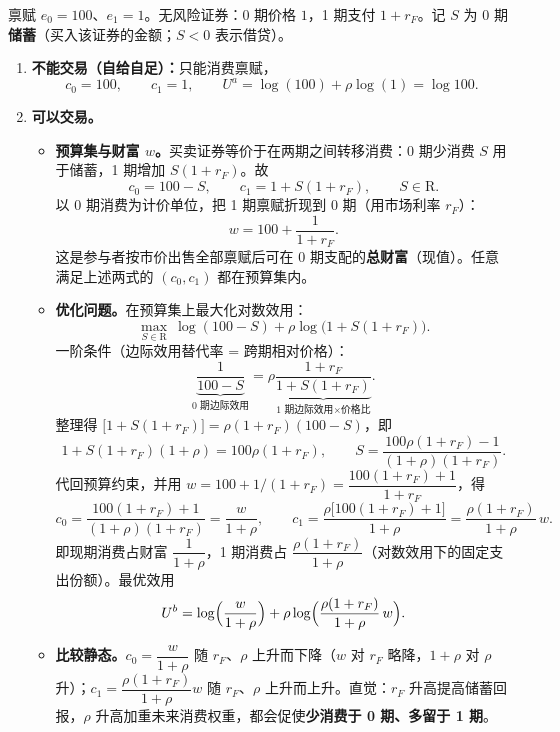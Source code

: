 \begin{solution}
禀赋 $e_0=100$、$e_1=1$。无风险证券：0 期价格 $1$，1 期支付 $1+r_F$。记 $S$ 为 0 期\textbf{储蓄}（买入该证券的金额；$S<0$ 表示借贷）。

\begin{enumerate}[label=(\alph*)]
    \item \textbf{不能交易（自给自足）：}只能消费禀赋，
    \[
        c_0=100,\qquad c_1=1,\qquad
        U^{a}=\log(100)+\rho\log(1)=\log 100.
    \]

    \item \textbf{可以交易。}
    \begin{itemize}
        \item \textbf{预算集与财富 $w$。}买卖证券等价于在两期之间转移消费：0 期少消费 $S$ 用于储蓄，1 期增加 $S(1+r_F)$。故
        \[
            c_0=100-S,\qquad c_1=1+S(1+r_F),\qquad S\in\mathrm{R}.
        \]
        以 0 期消费为计价单位，把 1 期禀赋折现到 0 期（用市场利率 $r_F$）：
        \[
            w=100+\frac{1}{1+r_F}.
        \]
        这是参与者按市价出售全部禀赋后可在 0 期支配的\textbf{总财富}（现值）。任意满足上述两式的 $(c_0,c_1)$ 都在预算集内。

        \item \textbf{优化问题。}在预算集上最大化对数效用：
        \[
            \max_{S\in\mathrm{R}}\ \log(100-S)+\rho\log\bigl(1+S(1+r_F)\bigr).
        \]
        一阶条件（边际效用替代率 = 跨期相对价格）：
        \[
            \underbrace{\frac{1}{100-S}}_{\text{0 期边际效用}}
            =\rho\underbrace{\frac{1+r_F}{1+S(1+r_F)}}_{\text{1 期边际效用}\times\text{价格比}}.
        \]
        整理得 $\bigl[1+S(1+r_F)\bigr]=\rho(1+r_F)(100-S)$，即
        \[
            1+S(1+r_F)(1+\rho)=100\rho(1+r_F),
            \qquad
            S=\frac{100\rho(1+r_F)-1}{(1+\rho)(1+r_F)}.
        \]
        代回预算约束，并用 $w=100+1/(1+r_F)=\dfrac{100(1+r_F)+1}{1+r_F}$，得
        \[
            c_0=\frac{100(1+r_F)+1}{(1+\rho)(1+r_F)}=\frac{w}{1+\rho},\qquad
            c_1=\frac{\rho\bigl[100(1+r_F)+1\bigr]}{1+\rho}=\frac{\rho(1+r_F)}{1+\rho}\,w.
        \]
        即现期消费占财富 $\dfrac{1}{1+\rho}$，1 期消费占 $\dfrac{\rho(1+r_F)}{1+\rho}$（对数效用下的固定支出份额）。最优效用
        \[
            U^{b}=\log\Bigl(\frac{w}{1+\rho}\Bigr)+\rho\log\Bigl(\frac{\rho(1+r_F)}{1+\rho}\,w\Bigr).
        \]

        \item \textbf{比较静态。}$c_0=\dfrac{w}{1+\rho}$ 随 $r_F$、$\rho$ 上升而下降（$w$ 对 $r_F$ 略降，$1+\rho$ 对 $\rho$ 升）；$c_1=\dfrac{\rho(1+r_F)}{1+\rho}w$ 随 $r_F$、$\rho$ 上升而上升。直觉：$r_F$ 升高提高储蓄回报，$\rho$ 升高加重未来消费权重，都会促使\textbf{少消费于 0 期、多留于 1 期}。
    \end{itemize}


\end{enumerate}
\end{solution}
